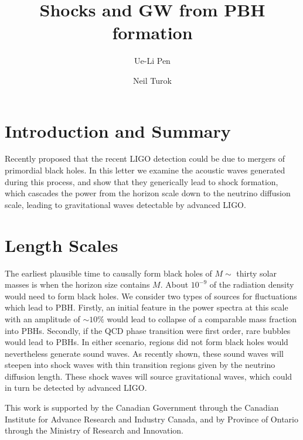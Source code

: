 \documentclass[aps,showpacs,twocolumn,floats,prd,superscriptaddress,nofootinbib]{revtex4}
\begin{document}
\title{Shocks and GW from PBH formation}


\author{Ue-Li Pen}

\author{Neil Turok}

\begin{abstract}

\end{abstract}

\maketitle

\section{Introduction and Summary}

Recently \citet{2016arXiv160300464B} proposed that the recent LIGO
detection\cite{2016PhRvL.116f1102A} could be due to mergers of
primordial black holes.  In this letter we examine the acoustic waves
generated during this process, and show that they generically lead to
shock formation, which cascades the power from the horizon scale down
to the neutrino diffusion scale, leading to gravitational waves
detectable by advanced LIGO.

\section{Length Scales}

The earliest plausible time to causally form black holes of $M\sim$ thirty
solar masses is when the horizon size contains $M$.  About $10^{-9}$ of
the radiation density would need to form black holes.  We consider two
types of sources for fluctuations which lead to PBH.  Firstly, an initial
feature in the power spectra at this scale with an amplitude of $\sim
10\%$ would lead to collapse of a comparable mass fraction into PBHs.
Secondly, if the QCD phase transition were first order, rare bubbles
would lead to PBHs.  In either scenario, regions did not form black holes would
nevertheless generate sound waves.  As recently shown\cite{}, these
sound waves will steepen into shock waves with thin transition
regions given by the neutrino diffusion length.  These shock waves 
will source gravitational waves, which could in turn be detected by
advanced LIGO.


\acknowledgments


This work is supported by the Canadian Government through the Canadian
Institute for Advance Research and Industry Canada, and by Province of
Ontario through the Ministry of Research and Innovation.

\appendix

%

\end{document}
